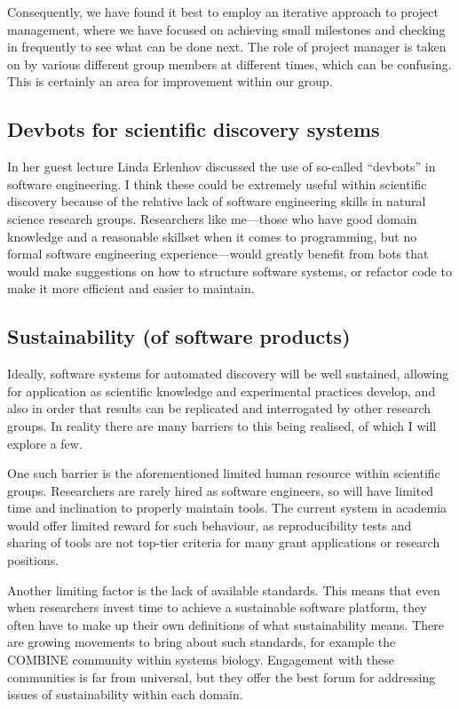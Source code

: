 \documentclass[11pt]{article}
\begin{document}
Consequently, we have found it best to employ an iterative approach to project management, where we have focused on achieving small milestones and checking in frequently to see what can be done next. The role of project manager is taken on by various different group members at different times, which can be confusing. This is certainly an area for improvement within our group.

\subsection{Devbots for scientific discovery systems}

In her guest lecture Linda Erlenhov discussed the use of so-called ``devbots'' in software engineering. I think these could be extremely useful within scientific discovery because of the relative lack of software engineering skills in natural science research groups. Researchers like me---those who have good domain knowledge and a reasonable skillset when it comes to programming, but no formal software engineering experience---would greatly benefit from bots that would make suggestions on how to structure software systems, or refactor code to make it more efficient and easier to maintain.

\subsection{Sustainability (of software products)}

Ideally, software systems for automated discovery will be well sustained, allowing for application as scientific knowledge and experimental practices develop, and also in order that results can be replicated and interrogated by other research groups. In reality there are many barriers to this being realised, of which I will explore a few.

One such barrier is the aforementioned limited human resource within scientific groups. Researchers are rarely hired as software engineers, so will have limited time and inclination to properly maintain tools. The current system in academia would offer limited reward for such behaviour, as reproducibility tests and sharing of tools are not top-tier criteria for many grant applications or research positions.

Another limiting factor is the lack of available standards.
This means that even when researchers invest time to achieve a sustainable software platform, they often have to make up their own definitions of what sustainability means.
There are growing movements to bring about such standards, for example the COMBINE community within systems biology.
Engagement with these communities is far from universal, but they offer the best forum for addressing issues of sustainability within each domain.
\end{document}
